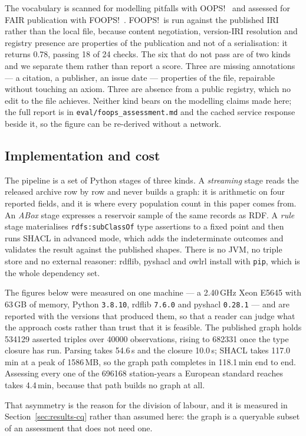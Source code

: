 The vocabulary is scanned for modelling pitfalls with
OOPS!~\cite{poveda2014oops} and assessed for FAIR publication with
FOOPS!~\cite{garijo2021foops}. FOOPS!\ is run against the published IRI rather
than the local file, because content negotiation, version-IRI resolution and
registry presence are properties of the publication and not of a serialisation:
it returns \num{0.78}, passing \num{18} of \num{24}
checks. The six that do not pass are of two kinds and
we separate them rather than report a score. Three are missing annotations --- a
citation, a publisher, an issue date --- properties of the file, repairable
without touching an axiom. Three are absence from a public registry, which no
edit to the file achieves. Neither kind bears on the modelling claims made here;
the full report is in \texttt{eval/foops\_assessment.md} and the cached service
response beside it, so the figure can be re-derived without a network.

\subsection{Implementation and cost}
\label{sec:methods-impl}
The pipeline is a set of Python stages of three kinds. A \emph{streaming}
stage reads the released archive row by row and never builds a graph: it is
arithmetic on four reported fields, and it is where every population count in
this paper comes from. An \emph{ABox} stage expresses a reservoir sample of the
same records as RDF. A \emph{rule} stage materialises \texttt{rdfs:subClassOf}
type assertions to a fixed point and then runs SHACL in advanced mode, which
adds the indeterminate outcomes and validates the result against the published
shapes. There is no JVM, no triple store and no external reasoner: rdflib,
pyshacl and owlrl install with \texttt{pip}, which is the whole dependency set.

The figures below were measured on one machine --- a \num{2.40}\,GHz Xeon
E5645 with \num{63}\,GB of memory, Python \texttt{3.8.10}, rdflib
\texttt{7.6.0} and pyshacl \texttt{0.28.1} --- and are reported with the
versions that produced them, so that a reader can judge what the
approach costs rather than trust that it is
feasible. The published graph holds
\num{534129} asserted triples over \num{40000} observations, rising to
\num{682331} once the type closure has run. Parsing takes \num{54.6}\,s and
the closure \num{10.0}\,s; SHACL takes \num{117.0}\,min at a peak of
\num{1586}\,MB, so the graph path completes in \num{118.1}\,min end to end.
Assessing every one of the \num{696168} station-years a European standard
reaches takes \num{4.4}\,min, because that path builds no graph at all.

That asymmetry is the reason for the division of labour, and it is measured in
Section~\ref{sec:results-cq} rather than assumed here: the graph is a
queryable subset of an assessment that does not need one.
